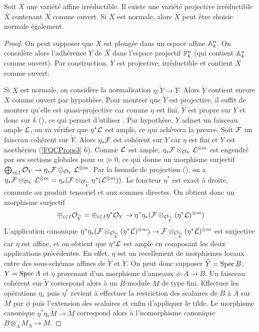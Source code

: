 \begin{lem}\label{CompletionNormal}
Soit $X$ une variété affine irréductible.
Il existe une variété projective irréductible $\bar{X}$ contenant $X$ comme ouvert. Si $X$ est normale, alors $\bar{X}$ peut être choisie normale également.
\end{lem}
\begin{proof}
On peut supposer que $X$ est plongée dans un espace affine $\mathbb{A}^n_k$. On considère alors l'adhérence $Y$ de $X$ dans l'espace projectif $\mathbb{P}^n_k$ (qui contient $\mathbb{A}^n_k$ comme ouvert). Par construction, $Y$ est projective, irréductible et contient $X$ comme ouvert.

Si $X$ est normale, on considère la normalisation $\eta:\widetilde{Y}\rightarrow Y$. Alors $\widetilde{Y}$ contient encore $X$ comme ouvert par hypothèse. Pour montrer que $\widetilde{Y}$ est projective, il suffit de montrer qu'elle est quasi-projective car comme $\eta$ est fini, $\widetilde{Y}$ est propre sur $Y$ et donc sur $k$ (\cite[II.4.8, ex II.4.1]{Hartshorne}), ce qui permet d'utiliser \cite[ex II.4.4]{Hartshorne}. Par hypothèse, $Y$ admet un faisceau ample $\mathcal{L}$, on va vérifier que $\eta^*\mathcal{L}$ est ample, ce qui achèvera la preuve. Soit $\mathcal{F}$ un faisceau cohérent sur $\widetilde{Y}$. Alors $\eta_*\mathcal{F}$ est cohérent sur $Y$ car $\eta$ est fini et $Y$ est noethérien (\ref{FQCProps3} 6). Comme $\mathcal{L}$ est ample, $\eta_*\mathcal{F}\otimes_{\mathcal{O}_Y} \mathcal{L}^{\otimes m}$ est engendré par ses sections globales pour $m\gg 0$, ce qui donne un morphisme surjectif $\bigoplus_{i\in I}\mathcal{O}_Y\rightarrow \eta_*\mathcal{F}\otimes_{\mathcal{O}_Y} \mathcal{L}^{\otimes m}$. Par la formule de projection (\cite[ex II.5.1.d]{Hartshorne}), on a $\eta_*\mathcal{F}\otimes_{\mathcal{O}_Y} \mathcal{L}^{\otimes m}=\eta_*(\mathcal{F}\otimes_{\mathcal{O}_{\widetilde{Y}}}\eta^*(\mathcal{L}^{\otimes m}))$. Le foncteur $\eta^*$ est exact à droite, commute au produit tensoriel et aux sommes directes. On obtient donc un morphisme surjectif 
$$\oplus_{i\in I}\mathcal{O}_{\widetilde{Y}}=\oplus_{i\in I}\eta^*\mathcal{O}_Y\rightarrow \eta^*\eta_*(\mathcal{F}\otimes_{\mathcal{O}_{\widetilde{Y}}}(\eta^*\mathcal{L})^{\otimes m})$$
L'application canonique $\eta^*\eta_*(\mathcal{F}\otimes_{\mathcal{O}_{\widetilde{Y}}}(\eta^*\mathcal{L})^{\otimes m})\rightarrow \mathcal{F}\otimes_{\mathcal{O}_{\widetilde{Y}}}(\eta^*\mathcal{L})^{\otimes m}$ est surjective car $\eta$ est affine, et on obtient que $\eta^*\mathcal{L}$ est ample en composant les deux applications précédentes. En effet, $\eta$ est un recollement de morphismes locaux entre des sous-schémas affines de $\widetilde{Y}$ et $Y$. On peut donc supposer $\widetilde{Y}=\operatorname{Spec} B$, $Y=\operatorname{Spec} A$ et $\eta$ provenant d'un morphisme d'anneaux $\phi:A\rightarrow B$. Un faisceau cohérent sur $\widetilde{Y}$ correspond alors à un $B$-module $M$ de type fini. Effectuer les opérations $\eta_*$ puis $\eta^*$ revient à effectuer la restriction des scalaires de $B$ à $A$ sur $M$ par $\phi$ puis l'extension des scalaires et enfin d'appliquer le tilde. Le morphisme canonique $\eta^*\eta_* \widetilde{M}\rightarrow \widetilde{M}$ correspond alors à l'isomorphisme canonique $B\otimes_A M_A\rightarrow M$.
\end{proof}


